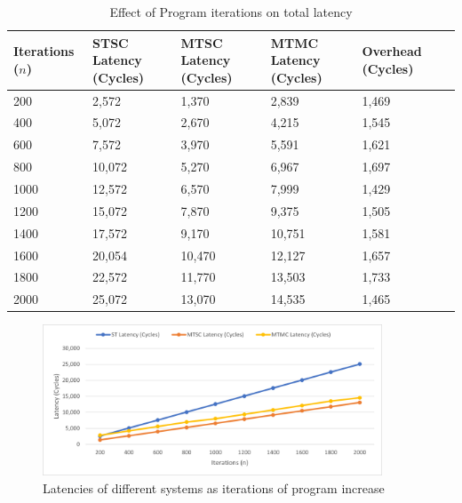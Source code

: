 \begin{table}
    \centering
    \begin{tabular}{l|l|l|l|l|l}
    \textbf{Iterations ($n$)} & \textbf{STSC Latency (Cycles)} & \textbf{MTSC Latency (Cycles)} & \textbf{MTMC Latency (Cycles)} & \textbf{Overhead (Cycles)}\\ \hline
     200        & 2,572               & 1,370                 & 2,839                 &  1,469                 \\
     400        & 5,072               & 2,670                 & 4,215                 &  1,545                 \\
     600        & 7,572               & 3,970                 & 5,591                 &  1,621                 \\
     800        & 10,072              & 5,270                 & 6,967                 &  1,697                 \\
     1000       & 12,572              & 6,570                 & 7,999                 &  1,429                 \\
     1200       & 15,072              & 7,870                 & 9,375                 &  1,505                 \\
     1400       & 17,572              & 9,170                 & 10,751                &  1,581                 \\
     1600       & 20,054              & 10,470                & 12,127                &  1,657                 \\
     1800       & 22,572              & 11,770                & 13,503                &  1,733                 \\
     2000       & 25,072              & 13,070                & 14,535                &  1,465                 \\                                 
    \end{tabular}
    \caption{Effect of Program iterations on total latency}
    \label{tbl:system_results}
\end{table}

\begin{figure}[!htb]
    \centering
    \includegraphics[width=0.9\textwidth]{05_evaluation/images/latency_vs_iter.png}
    \caption{Latencies of different systems as iterations of program increase}
    \label{fig:latency_v_iter}
\end{figure}

